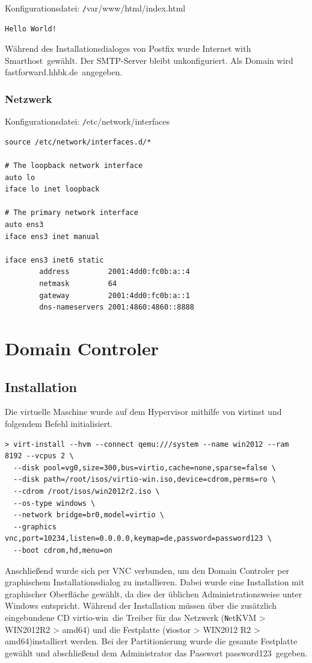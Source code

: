 Konfigurationsdatei: {\texttt /var/www/html/index.html}
\begin{lstlisting}
Hello World!
\end{lstlisting}

Während des Installationsdialoges von Postfix wurde \ql Internet with Smarthost\qr\ gewählt. Der SMTP-Server bleibt unkonfiguriert. Als Domain wird \ql fastforward.hhbk.de\qr\ angegeben.

\subsubsection{Netzwerk}

Konfigurationsdatei: {\texttt /etc/network/interfaces}
\begin{lstlisting}
source /etc/network/interfaces.d/*

# The loopback network interface
auto lo
iface lo inet loopback

# The primary network interface
auto ens3
iface ens3 inet manual

iface ens3 inet6 static
        address			2001:4dd0:fc0b:a::4
        netmask			64
        gateway			2001:4dd0:fc0b:a::1
        dns-nameservers	2001:4860:4860::8888
\end{lstlisting}

\section{Domain Controler}

\subsection{Installation}

Die virtuelle Maschine wurde auf dem Hypervisor mithilfe von {\texttt virtinst} und folgendem Befehl initialisiert.

\begin{lstlisting}[numbers=none]
> virt-install --hvm --connect qemu:///system --name win2012 --ram 8192 --vcpus 2 \
  --disk pool=vg0,size=300,bus=virtio,cache=none,sparse=false \
  --disk path=/root/isos/virtio-win.iso,device=cdrom,perms=ro \
  --cdrom /root/isos/win2012r2.iso \
  --os-type windows \
  --network bridge=br0,model=virtio \
  --graphics vnc,port=10234,listen=0.0.0.0,keymap=de,password=password123 \
  --boot cdrom,hd,menu=on
\end{lstlisting}

Anschließend wurde sich per VNC verbunden, um den Domain Controler per graphischem Installationsdialog zu installieren. Dabei wurde eine Installation mit graphischer Oberfläche gewählt, da dies der üblichen Administrationsweise unter Windows entspricht. Während der Installation müssen über die zusätzlich eingebundene CD \ql virtio-win\qr\ die Treiber für das Netzwerk ({\texttt NetKVM > WIN2012R2 > amd64}) und die Festplatte ({\texttt viostor > WIN2012	R2 > amd64})installiert werden. Bei der Partitionierung wurde die gesamte Festplatte gewählt und abschließend dem Administrator das Passwort \ql password123\qr\ gegeben.

